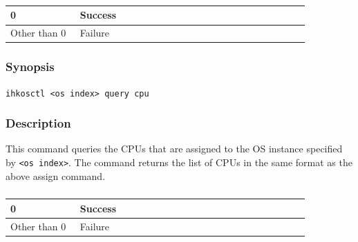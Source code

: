 \documentclass[twoside,11pt,fleqn]{book}
\begin{document}
\subsubsection*{}
\begin{table}[!h]
\footnotesize
\begin{tabular}{|p{0.20\linewidth}|p{0.66\linewidth}|} \hline
0&Success\\ \hline
Other than 0&Failure\\ \hline
\end{tabular}
\vspace{-0em}
\end{table}
\FloatBarrier

\subsubsection{}
\subsubsection*{Synopsis}{\quad} \texttt{ihkosctl <os index> query cpu}
\subsubsection*{Description}{\quad}
This command queries the CPUs that are assigned to the OS instance specified by \texttt{<os index>}.
The command returns the list of CPUs in the same format as the above assign command.

\subsubsection*{}
\begin{table}[!h]
\footnotesize
\begin{tabular}{|p{0.20\linewidth}|p{0.66\linewidth}|} \hline
0&Success\\ \hline
Other than 0&Failure\\ \hline
\end{tabular}
\vspace{-0em}
\end{table}
\FloatBarrier

\subsubsection{}
\end{document}

